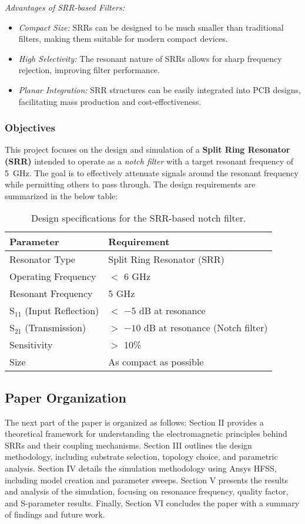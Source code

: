\documentclass[conference]{IEEEtran}
\begin{document}
\textit{Advantages of SRR-based Filters:}
\begin{itemize}
    \item \textit{Compact Size:} SRRs can be designed to be much smaller than traditional filters, making them suitable for modern compact devices.
    \item \textit{ High Selectivity:} The resonant nature of SRRs allows for sharp frequency rejection, improving filter performance.
    \item \textit{Planar Integration:} SRR structures can be easily integrated into PCB designs, facilitating mass production and cost-effectiveness.
\end{itemize}
\subsubsection{Objectives}
This project focuses on the design and simulation of a \textbf{Split Ring Resonator (SRR)} intended to operate as a \textit{notch filter} with a target resonant frequency of 5~GHz. The goal is to effectively attenuate signals around the resonant frequency while permitting others to pass through. The design requirements are summarized in the below table:

\begin{table}[ht]
\centering
\begin{tabular}{|l|l|}
\hline
\textbf{Parameter} & \textbf{Requirement} \\ \hline
Resonator Type     & Split Ring Resonator (SRR) \\ \hline
Operating Frequency & $ < $ 6 GHz \\ \hline
Resonant Frequency  & 5 GHz \\ \hline
S$_{11}$ (Input Reflection) & $<$ $-5$ dB at resonance \\ \hline
S$_{21}$ (Transmission) &$ >$ $-10$ dB at resonance (Notch filter) \\ \hline
Sensitivity         & $> $ 10\% \\ \hline
Size                & As compact as possible \\ \hline
\end{tabular}
\caption*{Design specifications for the SRR-based notch filter.}
\end{table}

\subsection{Paper Organization}
The next part of the paper is organized as follows: Section II provides a theoretical framework for understanding the electromagnetic principles behind SRRs and their coupling mechanisms. Section III outlines the design methodology, including substrate selection, topology choice, and parametric analysis. Section IV details the simulation methodology using Ansys HFSS, including model creation and parameter sweeps. Section V presents the results and analysis of the simulation, focusing on resonance frequency, quality factor, and S-parameter results. Finally, Section VI concludes the paper with a summary of findings and future work.
\end{document}
